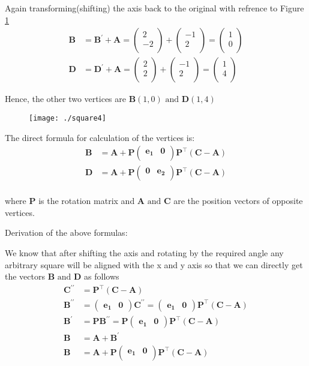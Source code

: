\documentclass[12pt]{article}
\providecommand{\brak}[1]{\ensuremath{\left(#1\right)}}
\newcommand{\myvec}[1]{\ensuremath{\begin{pmatrix}#1\end{pmatrix}}}
\let\vec\mathbf
\begin{document}
Again transforming(shifting) the axis back to the original with refrence to Figure \ref{fig:Fig5}
\begin{align}
\vec{B} &= \vec{B^{\prime}}+\vec{A} = \myvec{
2 \\
-2\\
}+\myvec{
-1 \\
2\\
} = 
\myvec{
1 \\
0\\
}\\
\vec{D} &= \vec{D^{\prime}}+\vec{A} = \myvec{
2 \\
2\\
}+\myvec{
-1 \\
2\\
} = 
\myvec{
1 \\
4 \\
}
\end{align}

Hence, the other two vertices are $\vec{B}(1,0) \text{ and } \vec{D}(1,4)$   

\begin{figure}[!h]
	\begin{center} 
	    \texttt{[image: ./square4]}
	\end{center}
\caption{}
\label{fig:Fig5}
\end{figure}

The direct formula for calculation of the vertices is:
\begin{align}
\vec{B} &= \vec{A} + \vec{P}\myvec{
\vec{e_{1}}&\vec{0}\\
}
\vec{P}^\top \brak{\vec{C}-\vec{A}}\\
\vec{D} &= \vec{A} + \vec{P}\myvec{
\vec{0}&\vec{e_{2}}\\
}
\vec{P}^\top \brak{\vec{C}-\vec{A}}\\
\end{align}

where $\vec{P}$ is the rotation matrix and $\vec{A} \text{ and } \vec{C}$ are the position vectors of opposite vertices.

Derivation of the above formulas:

We know that after shifting the axis and rotating by the required angle any arbitrary square will be aligned with the x and y axis so that we can directly get the vectors $\vec{B} \text{ and } \vec{D}$ as follows
\begin{align}
\vec{C^{\prime\prime}} &= \vec{P}^\top \brak{\vec{C} - \vec{A}}\\
\vec{B^{\prime\prime}} &= \myvec{
\vec{e_{1}} & \vec{0}
}\vec{C^{\prime\prime}} = \myvec{
\vec{e_{1}} & \vec{0}
}\vec{P}^\top \brak{\vec{C} - \vec{A}}\\
\vec{B^{\prime}} &= \vec{P} \vec{B^{\prime\prime}}  = \vec{P}\myvec{
\vec{e_{1}} & \vec{0}
}\vec{P}^\top \brak{\vec{C} - \vec{A}}\\
\vec{B} &= \vec{A}+\vec{B^{\prime}}\\
\vec{B} &= \vec{A} + \vec{P}\myvec{
\vec{e_{1}}&\vec{0}\\
}
\vec{P}^\top\brak{\vec{C}-\vec{A}}
\end{align}
\end{document}

